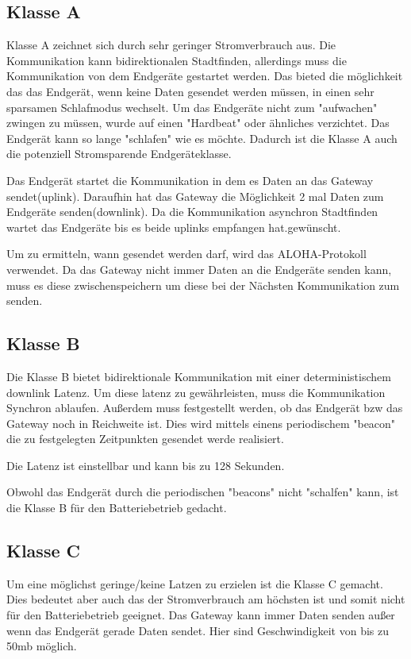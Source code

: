 \documentclass[a4paper,12pt]{article}
\begin{document}
        \subsection{Klasse A}
    Klasse A zeichnet sich durch sehr geringer Stromverbrauch aus. Die Kommunikation kann bidirektionalen Stadtfinden, allerdings muss die Kommunikation von dem Endgeräte gestartet werden. Das bieted die möglichkeit das das Endgerät, wenn keine Daten gesendet werden müssen, in einen sehr
    sparsamen Schlafmodus wechselt. Um das Endgeräte nicht zum "aufwachen" zwingen zu müssen, wurde auf einen "Hardbeat" oder ähnliches verzichtet. Das Endgerät kann so lange "schlafen" wie es möchte. Dadurch ist die Klasse A auch die potenziell Stromsparende Endgeräteklasse.
    
    Das Endgerät startet die Kommunikation in dem es Daten an das Gateway sendet(uplink). Daraufhin hat das Gateway die Möglichkeit 2 mal Daten zum Endgeräte senden(downlink). Da die Kommunikation asynchron Stadtfinden wartet das Endgeräte bis es beide uplinks empfangen hat.gewünscht.
    
    Um zu ermitteln, wann gesendet werden darf, wird das ALOHA-Protokoll verwendet.
    Da das Gateway nicht immer Daten an die Endgeräte senden kann, muss es diese zwischenspeichern um diese bei der Nächsten Kommunikation zum senden.
    \subsection{Klasse B}
    Die Klasse B bietet bidirektionale Kommunikation mit einer deterministischem downlink Latenz. Um diese latenz zu gewährleisten, muss die Kommunikation Synchron ablaufen. Außerdem muss festgestellt werden, ob das Endgerät bzw das Gateway noch in Reichweite ist. Dies wird mittels einens periodischem "beacon" die zu festgelegten
    Zeitpunkten gesendet werde realisiert.

    Die Latenz ist einstellbar und kann bis zu 128 Sekunden.

    Obwohl das Endgerät durch die periodischen "beacons" nicht "schalfen" kann, ist die Klasse B für den Batteriebetrieb gedacht.
    \subsection{Klasse C}
    Um eine möglichst geringe/keine Latzen zu erzielen ist die Klasse C gemacht. Dies bedeutet aber auch das der Stromverbrauch am höchsten ist und somit nicht für den Batteriebetrieb geeignet.
    Das Gateway kann immer Daten senden außer wenn das Endgerät gerade Daten sendet. Hier sind Geschwindigkeit von bis zu 50mb möglich.
\end{document}
